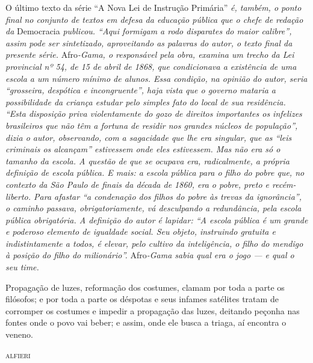 \begin{didascalia}
O último texto da série ``A Nova Lei de Instrução Primária'' \emph{é,
também, o ponto final no conjunto de textos em defesa da educação
pública que o chefe de redação da} Democracia \emph{publicou. ``Aqui
formigam a rodo disparates do maior calibre'', assim pode ser
sintetizado, aproveitando as palavras do autor, o texto final da
presente série.} Afro\emph{-Gama, o responsável pela obra, examina um
trecho da Lei provincial nº 54, de 15 de abril de 1868, que condicionava a
existência de uma escola a um número mínimo de alunos. Essa condição, na
opinião do autor, seria ``grosseira, despótica e incongruente'', haja
vista que o governo mataria a possibilidade da criança estudar pelo
simples fato do local de sua residência. ``Esta disposição priva
violentamente do gozo de direitos importantes os infelizes brasileiros
que não têm a fortuna de residir nos grandes núcleos de população'',
dizia o autor, observando, com a sagacidade que lhe era singular, que as
``leis criminais os alcançam'' estivessem onde eles estivessem. Mas não
era só o tamanho da escola. A questão de que se ocupava era,
radicalmente, a própria definição de escola pública. E mais: a escola
pública para o filho do pobre que, no contexto da São Paulo de finais da
década de 1860, era o pobre, preto e recém-liberto. Para afastar ``a
condenação dos filhos do pobre às trevas da ignorância'', o caminho
passava, obrigatoriamente, vá desculpando a redundância, pela escola
pública obrigatória. A definição do autor é lapidar: ``A escola pública é
um grande e poderoso elemento de igualdade social. Seu objeto,
instruindo gratuita e indistintamente a todos, é elevar, pelo cultivo da
inteligência, o filho do mendigo à posição do filho do milionário''.}
Afro\emph{-Gama sabia qual era o jogo --- e qual o seu time.}
\end{didascalia}



\epigraph{Propagação de luzes, reformação dos costumes, clamam por toda a parte os
filósofos; e por toda a parte os déspotas e seus infames satélites
tratam de corromper os costumes e impedir a propagação das luzes,
deitando peçonha nas fontes onde o povo vai beber; e assim, onde ele
busca a triaga,\footnotemark{} aí encontra o veneno.}{\textsc{alfieri}\footnotemark}



